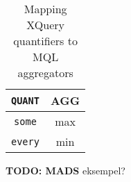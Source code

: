 \begin{table}[h]
\centering
\begin{tabular}{c|c} 
\texttt{QUANT} & \textsf{AGG} \\ \hline
\texttt{some} & \textsf{max} \\
\texttt{every} & \textsf{min}
\end{tabular}
\caption{Mapping XQuery quantifiers to MQL aggregators \label{tab:disc:quant}}
\end{table}

\textbf{\LARGE TODO: MADS} eksempel?